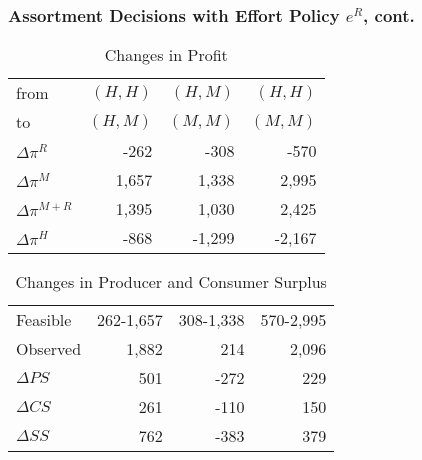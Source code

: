 \begin{frame}
\frametitle{Assortment Decisions with Effort Policy $e^R$, cont.}
\vspace{-0.4in}
\begin{table}[htp]
\caption{Changes in Profit}
\begin{center}
\begin{tabular}{|l| rrr|}
\hline
from &\hspace{0.15in} $(H,H)$ &\hspace{0.15in} $(H,M)$ & \hspace{0.15in}$(H,H)$ \\
to &\hspace{0.15in} $(H,M)$ & \hspace{0.15in}$(M,M)$ & \hspace{0.15in}$(M,M)$\\
 \hline
$\Delta \pi^R$&   -262 & -308& -570 \\
$\Delta \pi^M$ &  1,657 & 1,338 & 2,995 \\
$\Delta \pi^{M+R}$&   1,395 & 1,030& 2,425 \\
$\Delta \pi^H$  &-868 & -1,299 & -2,167 \\
 \hline
 \end{tabular}
\end{center}
\label{tab:assortmentonly2}
\end{table}
\vspace{-0.3in}
\begin{table}[htp]
\begin{center}
\caption{Changes in Producer and Consumer Surplus}
\begin{tabular}{|l| rrr|}
\hline
Feasible & 262-1,657 & 308-1,338&570-2,995 \\
Observed & 1,882 & 214& 2,096 \\
\hline
$\Delta PS$ & 501 & -272 & 229 \\
$\Delta CS$ &261 & -110 & 150 \\
$\Delta SS$ &762 & -383 & 379 \\ \hline
\end{tabular}
\end{center}
\label{tab:assortmentonly3}
\end{table}

\end{frame}

